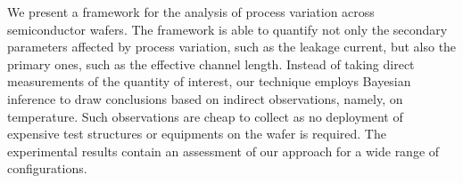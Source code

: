 We present a framework for the analysis of process variation across semiconductor wafers.
The framework is able to quantify not only the secondary parameters affected by process variation, such as the leakage current, but also the primary ones, such as the effective channel length.
Instead of taking direct measurements of the quantity of interest, our technique employs Bayesian inference to draw conclusions based on indirect observations, namely, on temperature.
Such observations are cheap to collect as no deployment of expensive test structures or equipments on the wafer is required.
The experimental results contain an assessment of our approach for a wide range of configurations.
